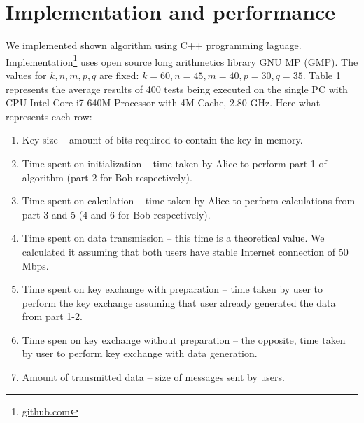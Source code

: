 \section{Implementation and performance}
	We implemented shown algorithm using C++ programming laguage. Implementation\footnote{\href{https://github.com/dargonaxxe/homomorphic-encryption-key-exchange}{github.com}} uses open source long arithmetics library GNU MP (GMP). The values for $ k, n, m, p, q $ are fixed: $ k = 60, n = 45, m = 40, p = 30, q = 35 $. Table 1 represents the average results of 400 tests being executed on the single PC with CPU Intel Core i7-640M Processor with 4M Cache, 2.80 GHz. Here what represents each row:
	\begin{enumerate}
		\item Key size -- amount of bits required to contain the key in memory. 
		\item Time spent on initialization -- time taken by Alice to perform part 1 of algorithm (part 2 for Bob respectively).
		\item Time spent on calculation -- time taken by Alice to perform calculations from part 3 and 5 (4 and 6 for Bob respectively).
		\item Time spent on data transmission -- this time is a theoretical value. We calculated it assuming that both users have stable Internet connection of 50 Mbps.
		\item Time spent on key exchange with preparation -- time taken by user to perform the key exchange assuming that user already generated the data from part 1-2. 
		\item Time spen on key exchange without preparation -- the opposite, time taken by user to perform key exchange with data generation.
		\item Amount of transmitted data -- size of messages sent by users. 
	\end{enumerate}
	